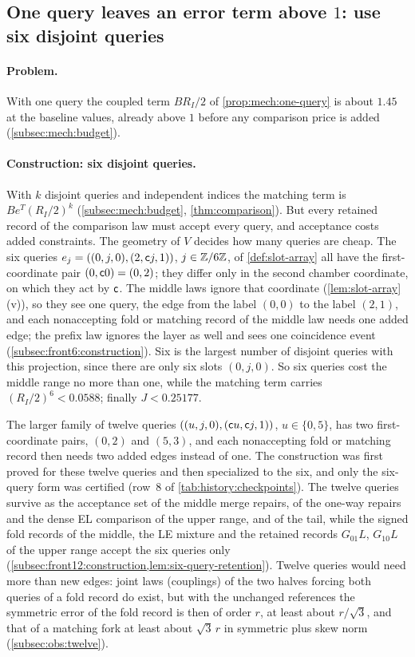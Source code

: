 \subsection{One query leaves an error term above \texorpdfstring{$1$}{1}: use six disjoint queries}
\label{subsec:walk:queries}

\paragraph{Problem.}
With one query the coupled term $BR_I/2$ of \cref{prop:mech:one-query}
is about $1.45$ at the baseline values, already above $1$ before any
comparison price is added (\cref{subsec:mech:budget}).

\paragraph{Construction: six disjoint queries.}
With $k$ disjoint queries and independent indices the matching term is
$Be^T(R_I/2)^k$ (\cref{subsec:mech:budget}, \cref{thm:comparison}).
But every retained record of the comparison law must accept every query, and
acceptance costs added constraints. The geometry of $V$ decides how many
queries are cheap. The six queries $e_j=((0,j,0),(2,\mathsf c j,1))$, $j\in\mathbb Z/6\mathbb Z$,
of \cref{def:slot-array} all have the first-coordinate pair $(0,\mathsf c0)=(0,2)$;
they differ only in the second chamber coordinate, on which they act by
$\mathsf c$. The middle laws ignore that coordinate (\cref{lem:slot-array}(v)), so
they see one query, the edge from the label $(0,0)$ to the label $(2,1)$, and
each nonaccepting fold or matching record of the middle law needs one added
edge; the prefix law ignores
the layer as well and sees one coincidence event
(\cref{subsec:front6:construction}). Six is the largest number of disjoint
queries with this projection, since there are only six slots $(0,j,0)$. So six
queries cost the middle range no more than one, while the matching term
carries $(R_I/2)^6<0.0588$; finally $J<0.25177$.

The larger family of twelve queries $((u,j,0),(\mathsf c u,\mathsf c j,1))$,
$u\in\{0,5\}$, has two first-coordinate pairs, $(0,2)$ and $(5,3)$, and each
nonaccepting fold or matching record then needs two added edges instead of
one. The construction was first proved for these twelve queries and then
specialized to the six, and only the six-query form was certified
(row~8 of \cref{tab:history:checkpoints}). The twelve queries survive as the
acceptance set of the middle merge repairs, of the one-way repairs and the
dense EL comparison of the upper range, and of the tail, while the signed fold
records of the middle, the LE mixture and the retained records $G_{01}L$,
$G_{10}L$ of the upper range accept the six queries only
(\cref{subsec:front12:construction,lem:six-query-retention}). Twelve queries
would need more than new edges: joint laws (couplings) of the two
halves forcing both queries of a fold record do exist, but with
the unchanged references the symmetric error of the
fold record is then of order $r$, at least about $r/\sqrt3$, and that of a
matching fork at least about $\sqrt3\,r$ in symmetric plus skew norm
(\cref{subsec:obs:twelve}).

